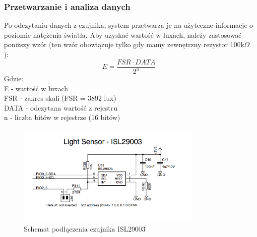     \subsubsection{Przetwarzanie i analiza danych}
    Po odczytaniu danych z czujnika, system przetwarza je na użyteczne informacje o poziomie natężenia światła. Aby uzyskać wartość w luxach, należy zastosować poniższy wzór (ten wzór obowiązuje tylko gdy mamy zewnętrzny rezystor 100k$\Omega$):\\
    \[
    E = \frac{FSR \cdot DATA}{2^{n}}
    \]
    Gdzie:\\
    E - wartość w luxach\\
    FSR - zakres skali (FSR = 3892 lux)\\
    DATA - odczytana wartość z rejestru\\
    n - liczba bitów w rejestrze (16 bitów)\\

    \begin{figure}[H]
        \centering
        \includegraphics[width=0.8\textwidth]{../ISL29003/schemat.png}
        \caption{Schemat podłączenia czujnika ISL29003}
        \label{fig:czujnik_swiatla}
    \end{figure}
